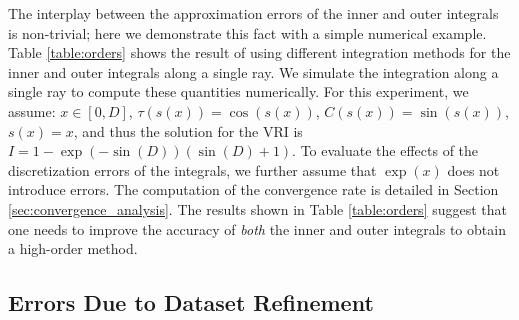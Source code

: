 The interplay between the approximation errors of the inner and outer integrals is non-trivial; 
  here we demonstrate this fact with a simple numerical example.  Table \ref{table:orders} shows the
  result of using different integration methods for the inner and outer integrals along a 
  single ray. We simulate the integration along a single ray to compute these quantities
  numerically. For this experiment, we assume:
  $x \in [0,D]$, $\tau(s(x)) = \cos(s(x))$, $C(s(x)) = \sin(s(x))$, $s(x) = x$, 
  and thus the solution for the VRI is $I = 1-\exp{(-\sin(D))}(\sin(D)+1)$. 
  To evaluate the effects of the discretization errors of the integrals, 
  we further assume that $\exp(x)$ does not introduce errors.  
  The computation of the convergence rate is detailed in Section \ref{sec:convergence_analysis}. The results shown in Table \ref{table:orders} suggest
  that one needs to improve the accuracy of \emph{both} the inner and outer integrals to obtain a
  high-order method.  

\subsection{Errors Due to Dataset Refinement}
\label{sec:VerViaDatasetRefinement}


